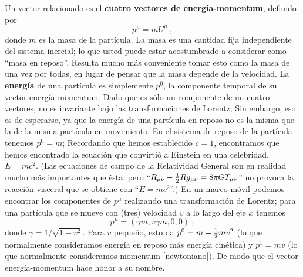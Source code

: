 \documentclass[11pt,b5paper,openany,twoside]{book}
\newcommand{\mn}{{\mu\nu}}
\begin{document}
Un vector relacionado es el {\bf cuatro vectores de energía-momentum}, definido por
\begin{equation}
p^\mu = m U^\mu\ ,\label{1.100}
\end{equation}
donde $m$ es la masa de la partícula.
La masa es una cantidad fija independiente del sistema inercial; lo que usted puede estar acostumbrado a considerar como ``masa en reposo''. Resulta mucho más conveniente tomar esto como la masa de una vez por todas, en lugar de pensar que la masa depende de la velocidad.
La {\bf energía} de una partícula es simplemente $p^0$, la componente temporal de su vector energía-momentum.
Dado que es sólo un componente de un cuatro vectores, no es invariante bajo las transformaciones de Lorentz; Sin embargo, eso es de esperarse, ya que la energía de una partícula en reposo no es la misma que la de la misma partícula en movimiento.
En el sistema de reposo de la partícula tenemos $p^0 =m$; Recordando que hemos establecido $c=1$, encontramos que hemos encontrado la ecuación que convirtió a Einstein en una celebridad, $E=mc^2$.
(Las ecuaciones de campo de la Relatividad General son en realidad mucho más importantes que ésta, pero ``$R_\mn - {1\over 2} Rg_\mn = 8\pi G T_\mn$'' no provoca la reacción visceral que se obtiene con ``$E=mc^2$''.)
En un marco móvil podemos encontrar los componentes de $p^\mu$ realizando una transformación de Lorentz; para una partícula que se mueve con (tres) velocidad $v$ a lo largo del eje $x$ tenemos
\begin{equation}
p^\mu = (\gamma m, v\gamma m, 0 ,0)\ ,\label{1.101}
\end{equation}
donde $\gamma = 1/\sqrt{1-v^2}$.
Para $v$ pequeño, esto da $p^0 = m+{1\over 2}mv^2$ (lo que normalmente consideramos energía en reposo más energía cinética) y $p^1 = mv$ (lo que normalmente consideramos momentum [newtoniano]).
De modo que el vector energía-momentum hace honor a su nombre.
\end{document}
